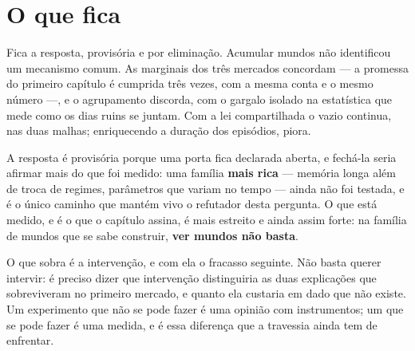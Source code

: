 \section{O que fica}

Fica a resposta, provisória e por eliminação. Acumular mundos não identificou um mecanismo
comum. As marginais dos três mercados concordam --- a promessa do primeiro capítulo é cumprida
três vezes, com a mesma conta e o mesmo número ---, e o agrupamento discorda, com o gargalo
isolado na estatística que mede como os dias ruins se juntam. Com a lei compartilhada o vazio
continua, nas duas malhas; enriquecendo a duração dos episódios, piora.

A resposta é provisória porque uma porta fica declarada aberta, e fechá-la seria afirmar mais do
que foi medido: uma família \textbf{mais rica} --- memória longa além de troca de regimes, parâmetros
que variam no tempo \cite{palma2010efficient} --- ainda não foi testada, e é o único caminho que mantém vivo o refutador
desta pergunta. O que está medido, e é o que o capítulo assina, é mais estreito e ainda assim
forte: na família de mundos que se sabe construir, \textbf{ver mundos não basta}.

O que sobra é a intervenção, e com ela o fracasso seguinte. Não basta querer intervir: é preciso
dizer que intervenção distinguiria as duas explicações que sobreviveram no primeiro mercado, e
quanto ela custaria em dado que não existe. Um experimento que não se pode fazer é uma opinião com
instrumentos; um que se pode fazer é uma medida, e é essa diferença que a travessia
ainda tem de enfrentar.
